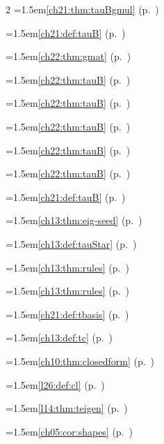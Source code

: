 \begin{multicols}{2}
\hangindent=1.5em\quad \ref{ch21:thm:tauBgmul} (p.~\pageref{ch21:thm:tauBgmul})\par
\hangindent=1.5em\quad \ref{ch21:def:tauB} (p.~\pageref{ch21:def:tauB})\par
\hangindent=1.5em\quad \ref{ch22:thm:gmat} (p.~\pageref{ch22:thm:gmat})\par
\hangindent=1.5em\quad \ref{ch22:thm:tauB} (p.~\pageref{ch22:thm:tauB})\par
\hangindent=1.5em\quad \ref{ch22:thm:tauB} (p.~\pageref{ch22:thm:tauB})\par
\hangindent=1.5em\quad \ref{ch22:thm:tauB} (p.~\pageref{ch22:thm:tauB})\par
\hangindent=1.5em\quad \ref{ch22:thm:tauB} (p.~\pageref{ch22:thm:tauB})\par
\hangindent=1.5em\quad \ref{ch22:thm:tauB} (p.~\pageref{ch22:thm:tauB})\par
\hangindent=1.5em\quad \ref{ch21:def:tauB} (p.~\pageref{ch21:def:tauB})\par
\hangindent=1.5em\quad \ref{ch13:thm:eig-seed} (p.~\pageref{ch13:thm:eig-seed})\par
\hangindent=1.5em\quad \ref{ch13:def:tauStar} (p.~\pageref{ch13:def:tauStar})\par
\hangindent=1.5em\quad \ref{ch13:thm:rules} (p.~\pageref{ch13:thm:rules})\par
\hangindent=1.5em\quad \ref{ch13:thm:rules} (p.~\pageref{ch13:thm:rules})\par
\hangindent=1.5em\quad \ref{ch21:def:tbasis} (p.~\pageref{ch21:def:tbasis})\par
\hangindent=1.5em\quad \ref{ch13:def:tc} (p.~\pageref{ch13:def:tc})\par
\hangindent=1.5em\quad \ref{ch10:thm:closedform} (p.~\pageref{ch10:thm:closedform})\par
\hangindent=1.5em\quad \ref{l26:def:cl} (p.~\pageref{l26:def:cl})\par
\hangindent=1.5em\quad \ref{l14:thm:teigen} (p.~\pageref{l14:thm:teigen})\par
\hangindent=1.5em\quad \ref{ch05:cor:shapes} (p.~\pageref{ch05:cor:shapes})\par

\end{multicols}
